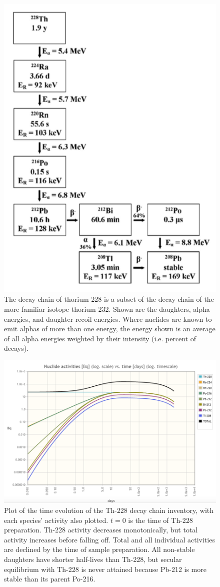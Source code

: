 \begin{figure}[th]
\begin{center}
\includegraphics[width=.5\textwidth]{./images/Th_228_decay_chain.png}
\caption{The decay chain of thorium 228 is a subset of the decay chain of the more familiar isotope thorium 232. Shown are the daughters, alpha energies, and daughter recoil energies. Where nuclides are known to emit alphas of more than one energy, the energy shown is an average of all alpha energies weighted by their intensity (i.e. percent of decays)\cite{Templeman2017, CRC}.}
\label{Th_228_decay_chain}
\end{center}
\end{figure}

\begin{figure}[thb]
\begin{center}
\includegraphics[width=\textwidth]{./images/thorium_decay_chain_plot.png}
\caption{Plot of the time evolution of the Th-228 decay chain inventory, with each species' activity also plotted. $t=0$ is the time of Th-228 preparation. Th-228 activity decreases monotonically, but total activity increases before falling off. Total and all individual activities are declined by the time of sample preparation. All non-stable daughters have shorter half-lives than Th-228, but secular equilibrium with Th-228 is never attained because Pb-212 is more stable than its parent Po-216.}
\label{plot_of_inventory_time_evolution}
\end{center}
\end{figure}


